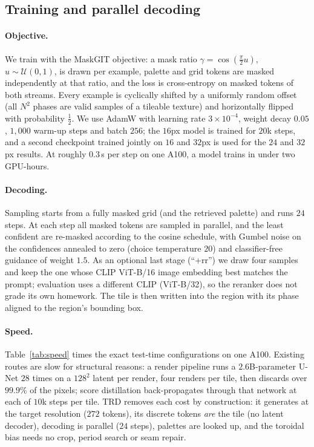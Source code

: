 \documentclass{article}
\newcommand{\trd}{\textsc{TRD}}
\begin{document}
\subsection{Training and parallel decoding}
\label{sec:decode}

\paragraph{Objective.} We train with the MaskGIT objective: a mask ratio
$\gamma=\cos(\tfrac{\pi}{2}u)$, $u\sim\mathcal U(0,1)$, is drawn per example,
palette and grid tokens are masked independently at that ratio, and the loss
is cross-entropy on masked tokens of both streams. Every example is
cyclically shifted by a uniformly random offset (all $N^2$ phases are valid
samples of a tileable texture) and horizontally flipped with probability
$\tfrac12$. We use AdamW with learning rate $3\times10^{-4}$, weight decay
$0.05$, $1{,}000$ warm-up steps and batch $256$; the $16$px model is trained
for $20$k steps, and a second checkpoint trained jointly on $16$ and $32$px is
used for the $24$ and $32$px results. At roughly $0.3$\,s per step on one
A100, a model trains in under two GPU-hours.

\paragraph{Decoding.} Sampling starts from a fully masked grid (and the
retrieved palette) and runs $24$ steps. At each step all masked tokens are
sampled in parallel, and the least confident are re-masked according to the
cosine schedule, with Gumbel noise on the confidences annealed to zero
(choice temperature $20$) and classifier-free guidance of weight $1.5$. As an
optional last stage (``+rr'') we draw four samples and keep the one whose
CLIP ViT-B/16 image embedding best matches the prompt; evaluation uses a
different CLIP (ViT-B/32), so the reranker does not grade its own homework.
The tile is then written into the region with its phase aligned to the
region's bounding box.

\paragraph{Speed.} Table~\ref{tab:speed} times the exact test-time
configurations on one A100. Existing routes are slow for structural reasons:
a render pipeline runs a $2.6$B-parameter U-Net $28$ times on a $128^2$
latent per render, four renders per tile, then discards over $99.9\%$ of the
pixels; score distillation back-propagates through that network at each of
$10$k steps per tile. \trd{} removes each cost by construction: it generates
at the target resolution ($272$ tokens), its discrete tokens \emph{are} the
tile (no latent decoder), decoding is parallel ($24$ steps), palettes are
looked up, and the toroidal bias needs no crop, period search or seam repair.
\end{document}

